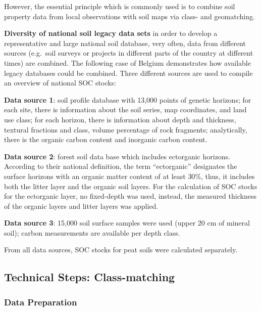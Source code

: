 \documentclass[10pt,b5paper,]{book}
\theoremstyle{definition}
\theoremstyle{definition}
\theoremstyle{definition}
\theoremstyle{remark}
\begin{document}
However, the essential principle which is commonly used is to combine
soil property data from local observations with soil maps via class- and
geomatching.

\textbf{Diversity of national soil legacy data sets} in order to develop
a representative and large national soil database, very often, data from
different sources (e.g.~soil surveys or projects in different parts of
the country at different times) are combined. The following case of
Belgium demonstrates how available legacy databases could be combined.
Three different sources are used to compile an overview of national SOC
stocks:

\textbf{Data source 1}: soil profile database with 13,000 points of
genetic horizons; for each site, there is information about the soil
series, map coordinates, and land use class; for each horizon, there is
information about depth and thickness, textural fractions and class,
volume percentage of rock fragments; analytically, there is the organic
carbon content and inorganic carbon content.

\textbf{Data source 2}: forest soil data base which includes ectorganic
horizons. According to their national definition, the term
``ectorganic'' designates the surface horizons with an organic matter
content of at least \(30\%\), thus, it includes both the litter layer
and the organic soil layers. For the calculation of SOC stocks for the
ectorganic layer, no fixed-depth was used, instead, the measured
thickness of the organic layers and litter layers was applied.

\textbf{Data source 3}: 15,000 soil surface samples were used (upper 20
cm of mineral soil); carbon measurements are available per depth class.

From all data sources, SOC stocks for peat soils were calculated
separately.

\hypertarget{technical-steps-class-matching}{%
\subsection{Technical Steps:
Class-matching}\label{technical-steps-class-matching}}

\hypertarget{data-preparation}{%
\subsubsection{Data Preparation}\label{data-preparation}}
\end{document}
